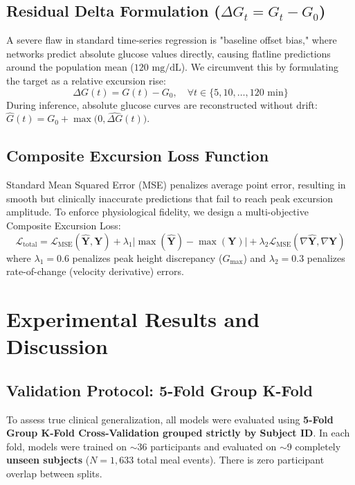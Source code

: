 \documentclass[conference]{IEEEtran}
\begin{document}
\subsection{Residual Delta Formulation ($\Delta G_t = G_t - G_0$)}
A severe flaw in standard time-series regression is "baseline offset bias," where networks predict absolute glucose values directly, causing flatline predictions around the population mean ($120\text{ mg/dL}$). We circumvent this by formulating the target as a relative excursion rise:
\begin{equation}
    \Delta G(t) = G(t) - G_0, \quad \forall t \in \{5, 10, \dots, 120\text{ min}\}
\end{equation}
During inference, absolute glucose curves are reconstructed without drift: $\hat{G}(t) = G_0 + \max\big(0, \hat{\Delta G}(t)\big)$.

\subsection{Composite Excursion Loss Function}
Standard Mean Squared Error (MSE) penalizes average point error, resulting in smooth but clinically inaccurate predictions that fail to reach peak excursion amplitude. To enforce physiological fidelity, we design a multi-objective Composite Excursion Loss:
\begin{equation}
    \mathcal{L}_{\text{total}} = \mathcal{L}_{\text{MSE}}(\hat{\mathbf{Y}}, \mathbf{Y}) + \lambda_1 \big|\max(\hat{\mathbf{Y}}) - \max(\mathbf{Y})\big| + \lambda_2 \mathcal{L}_{\text{MSE}}(\nabla \hat{\mathbf{Y}}, \nabla \mathbf{Y})
\end{equation}
where $\lambda_1 = 0.6$ penalizes peak height discrepancy ($G_{\max}$) and $\lambda_2 = 0.3$ penalizes rate-of-change (velocity derivative) errors.

\section{Experimental Results and Discussion}

\subsection{Validation Protocol: 5-Fold Group K-Fold}
To assess true clinical generalization, all models were evaluated using \textbf{5-Fold Group K-Fold Cross-Validation grouped strictly by Subject ID}. In each fold, models were trained on $\sim$36 participants and evaluated on $\sim$9 completely \textbf{unseen subjects} ($N=1,633$ total meal events). There is zero participant overlap between splits.
\end{document}
